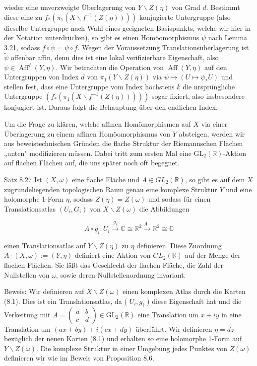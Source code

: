 \documentclass[10pt, letterpaper]{article}
\begin{document}
wieder eine unverzweigte Überlagerung von $Y \backslash Z(\eta)$ von Grad $d$. Bestimmt diese eine zu $f_{*}\left(\pi_{1}\left(X \backslash f^{-1}(Z(\eta))\right)\right)$ konjugierte Untergruppe (also dieselbe Untergruppe nach Wahl eines geeigneten Basispunkts, welche wir hier in der Notation unterdrücken), so gibt es einen Homöomorphismus $\widetilde{\psi}$ nach Lemma 3.21, sodass $f \circ \widetilde{\psi}=\psi \circ f$. Wegen der Voraussetzung Translationsüberlagerung ist $\widetilde{\psi}$ offenbar affin, denn dies ist eine lokal verifizierbare Eigenschaft, also $\psi \in \operatorname{Aff}^{f}(Y, \eta)$. Wir betrachten die Operation von $\operatorname{Aff}(Y, \eta)$ auf den Untergruppen von Index $d$ von $\pi_{1}(Y \backslash Z(\eta))$ via $\psi \mapsto\left(U \mapsto \psi_{*} U\right)$ und stellen fest, dass eine Untergruppe vom Index höchstens $k$ die ursprüngliche Untergruppe $\left(f_{*}\left(\pi_{1}\left(X \backslash f^{-1}(Z(\eta))\right)\right)\right)$ sogar fixiert, also insbesondere konjugiert ist. Daraus folgt die Behauptung über den endlichen Index.

Um die Frage zu klären, welche affinen Homömorphismen auf $X$ via einer Überlagerung zu einem affinen Homöomorphismus von $Y$ absteigen, werden wir aus beweistechnischen Gründen die flache Struktur der Riemannschen Flächen „unten" modifizieren müssen. Dabei tritt zum ersten Mal eine $\mathrm{GL}_{2}(\mathbb{R})$-Aktion auf flachen Flächen auf, die uns später noch oft begegnet.

Satz 8.27 Ist $(X, \omega)$ eine flache Fläche und $A \in G L_{2}(\mathbb{R})$, so gibt es auf dem $X$ zugrundeliegenden topologischen Raum genau eine komplexe Struktur $Y$ und eine holomorphe 1-Form $\eta$, sodass $Z(\eta)=Z(\omega)$ und sodass für einen Translationsatlas $\left(U_{i}, G_{i}\right)$ von $X \backslash Z(\omega)$ die Abbildungen

$$
A \circ g_{i}: U_{i} \xrightarrow{g_{i}} \mathbb{C} \cong \mathbb{R}^{2} \xrightarrow{A \cdot} \mathbb{R}^{2} \cong \mathbb{C}
$$

einen Translationsatlas auf $Y \backslash Z(\eta)$ zu $\eta$ definieren. Diese Zuordnung $A \cdot(X, \omega):= (Y, \eta)$ definiert eine Aktion von $G L_{2}(\mathbb{R})$ auf der Menge der flachen Flächen. Sie läßt das Geschlecht der flachen Fläche, die Zahl der Nullstellen von $\omega$, sowie deren Nullstellenordnung invariant.

Beweis: Wir definieren auf $X \backslash Z(\omega)$ einen komplexen Atlas durch die Karten (8.1). Dies ist ein Translationsatlas, da ( $U_{i}, g_{i}$ ) diese Eigenschaft hat und die Verkettung mit $A=\left(\begin{array}{ll}a & b \\ c & d\end{array}\right) \in \mathrm{GL}_{2}(\mathbb{R})$ eine Translation um $x+i y$ in eine Translation um $(a x+b y)+i(c x+d y)$ überführt. Wir definieren $\eta=d z$ bezüglich der neuen Karten (8.1) und erhalten so eine holomorphe 1-Form auf $Y \backslash Z(\omega)$. Die komplexe Struktur in einer Umgebung jedes Punktes von $Z(\omega)$ definieren wir wie im Beweis von Proposition 8.6.
\end{document}
